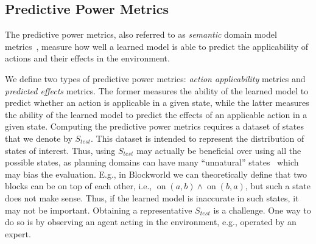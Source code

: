 \documentclass[letterpaper]{article} %
\newcommand{\stest}{\ensuremath{S_{\textit{test}}}\xspace}
\newif\ifaddcomments
\newcommand{\roni}[1]{\ifaddcomments{\textcolor{red}{[Roni: #1]}}\fi}
\newcommand{\cm}[1]{\ifaddcomments{\textcolor{olive}{[Christian: #1]}}\fi}
\begin{document}
\subsection{Predictive Power Metrics}
\label{sec:predictiveness-metrics}
The predictive power metrics, also referred to as \emph{semantic} domain model metrics~\citep{aineto2019learning,mordoch2024safe,le2024learning}, measure how well a learned model is able to predict the applicability of actions and their effects in the environment. 



We define two types of predictive power metrics: \emph{action applicability} metrics and \emph{predicted effects} metrics. 
The former measures the ability of the learned model to predict whether an action is applicable in a given state, while the latter measures the ability of the learned model to predict the effects of an applicable action in a given state.
Computing the predictive power metrics requires a dataset of states that we denote by $\stest$. 
This dataset is intended to represent the distribution of states of interest. %
Thus, using \stest may actually be beneficial over using all the possible states, as planning domains can have many ``unnatural'' states~\cite{grundke2024frepr} which may bias the evaluation. 
E.g., in Blockworld we can theoretically define that two blocks can be on top of each other, i.e., $\operatorname{on}(a, b) \wedge \operatorname{on}(b, a)$, but such a state does not make sense. Thus, if the learned model is inaccurate in such states, it may not be important. 
Obtaining a representative $\stest$ is a challenge. One way to do so is by observing an agent acting in the environment, e.g., operated by an expert. 
\end{document}
